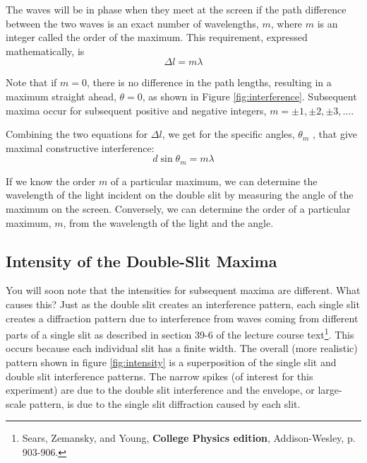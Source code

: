 The waves will be in phase when they meet at the screen if the path difference between the two waves is an exact number of wavelengths, $m$, where $m$ is an integer called the order of the maximum. This requirement, expressed mathematically, is
\begin{equation}
  \Delta l =m\lambda
\end{equation}

Note that if $m=0$, there is no difference in the path lengths, resulting in a maximum straight ahead, $\theta=0$, as shown in Figure {\ref{fig:interference}}. Subsequent maxima occur for subsequent positive and negative integers, $m=\pm 1, \pm 2, \pm 3, \dots$. \myskip

Combining the two equations for $\Delta l$, we get for the specific angles, $\theta_{m}$ , that give maximal constructive interference:
\begin{equation}
  d\sin \theta_{m}=m\lambda
\end{equation}

If we know the order $m$ of a particular maximum, we can determine the wavelength of the light incident on the double slit by measuring the angle of the maximum on the screen. Conversely, we can determine the order of a particular maximum, $m$, from the wavelength of the light and the angle.

\subsection{Intensity of the Double-Slit Maxima}
You will soon note that the intensities for subsequent maxima are different. What causes this? Just as the double slit creates an interference pattern, each single slit creates a diffraction pattern due to interference from waves coming from different parts of a single slit as described in section 39-6 of the lecture course text\footnote{Sears, Zemansky, and Young, \textbf{College Physics  edition}, Addison-Wesley, p. 903-906.}. This occurs because each individual slit has a finite width. The overall (more realistic) pattern shown in figure {\ref{fig:intensity}} is a superposition of the single slit and double slit interference patterns. The narrow spikes (of interest for this experiment) are due to the double slit interference and the envelope, or large-scale pattern, is due to the single slit diffraction caused by each slit.

